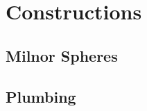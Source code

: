 \chapter{Constructions}\label{chap:constructions}

\section{Milnor Spheres}

\section{Plumbing}\label{sec:plumbing}
